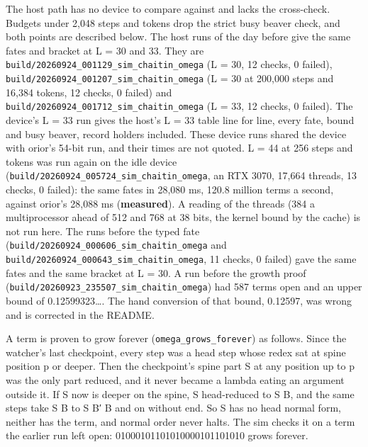 The host path has no device to compare against and lacks the cross-check. Budgets under 2,048 steps and tokens drop the strict busy beaver check, and both points are described below. The host runs of the day before give the same fates and bracket at L = 30 and 33. They are \texttt{build/\allowbreak{}20260924\_\allowbreak{}001129\_\allowbreak{}sim\_\allowbreak{}chaitin\_\allowbreak{}omega} (L = 30, 12 checks, 0 failed), \texttt{build/\allowbreak{}20260924\_\allowbreak{}001207\_\allowbreak{}sim\_\allowbreak{}chaitin\_\allowbreak{}omega} (L = 30 at 200,000 steps and 16,384 tokens, 12 checks, 0 failed) and \texttt{build/\allowbreak{}20260924\_\allowbreak{}001712\_\allowbreak{}sim\_\allowbreak{}chaitin\_\allowbreak{}omega} (L = 33, 12 checks, 0 failed). The device's L = 33 run gives the host's L = 33 table line for line, every fate, bound and busy beaver, record holders included. These device runs shared the device with orior's 54-bit run, and their times are not quoted. L = 44 at 256 steps and tokens was run again on the idle device (\texttt{build/\allowbreak{}20260924\_\allowbreak{}005724\_\allowbreak{}sim\_\allowbreak{}chaitin\_\allowbreak{}omega}, an RTX 3070, 17,664 threads, 13 checks, 0 failed): the same fates in 28,080 ms, 120.8 million terms a second, against orior's 28,088 ms (\textbf{measured}). A reading of the threads (384 a multiprocessor ahead of 512 and 768 at 38 bits, the kernel bound by the cache) is not run here. The runs before the typed fate (\texttt{build/\allowbreak{}20260924\_\allowbreak{}000606\_\allowbreak{}sim\_\allowbreak{}chaitin\_\allowbreak{}omega} and \texttt{build/\allowbreak{}20260924\_\allowbreak{}000643\_\allowbreak{}sim\_\allowbreak{}chaitin\_\allowbreak{}omega}, 11 checks, 0 failed) gave the same fates and the same bracket at L = 30. A run before the growth proof (\texttt{build/\allowbreak{}20260923\_\allowbreak{}235507\_\allowbreak{}sim\_\allowbreak{}chaitin\_\allowbreak{}omega}) had 587 terms open and an upper bound of 0.12599323…. The hand conversion of that bound, 0.12597, was wrong and is corrected in the README.

A term is proven to grow forever (\texttt{omega\_\allowbreak{}grows\_\allowbreak{}forever}) as follows. Since the watcher's last checkpoint, every step was a head step whose redex sat at spine position p or deeper. Then the checkpoint's spine part S at any position up to p was the only part reduced, and it never became a lambda eating an argument outside it. If S now is deeper on the spine, S head-reduced to S B, and the same steps take S B to S B′ B and on without end. So S has no head normal form, neither has the term, and normal order never halts. The sim checks it on a term the earlier run left open: 01000101101010000101101010 grows forever.

